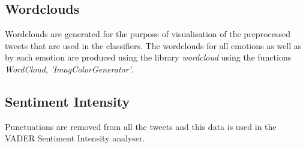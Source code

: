 \documentclass[a4paper, 12pt]{article}
\begin{document}
\subsection{Wordclouds}
\label{sec:Wordclouds}
Wordclouds are generated for the purpose of visualisation of the preprocessed tweets that are used in the classifiers.
The wordclouds for all emotions as well as by each emotion are produced using the library \textit{wordcloud} using the functions \textit{WordCloud}, \textit{'ImagColorGenerator'}. 

\begin{itemize}
    \item {\textbf{Maximum words} -  100}
    \item {\textbf{Interpolation} -  bilinear}
}
\end{itemize}

\subsection{Sentiment Intensity}
\label{sec:sentimentintensity}
Punctuations are removed from all the tweets  and this data is used in the VADER Sentiment Intensity analyser.
\end{document}
